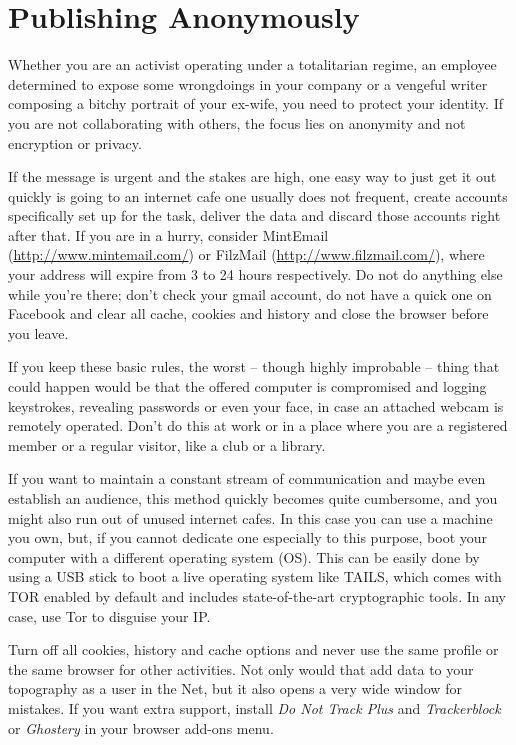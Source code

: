 \section{Publishing Anonymously}

Whether you are an activist operating under a totalitarian regime, an
employee determined to expose some wrongdoings in your company or a
vengeful writer composing a bitchy portrait of your ex-wife, you need to
protect your identity. If you are not collaborating with others, the
focus lies on anonymity and not encryption or privacy.

If the message is urgent and the stakes are high, one easy way to just
get it out quickly is going to an internet cafe one usually does not
frequent, create accounts specifically set up for the task, deliver the
data and discard those accounts right after that. If you are in a hurry,
consider MintEmail
(\href{http://www.mintemail.com/}{http://www.mintemail.com/}) or
FilzMail (\href{http://www.filzmail.com/}{http://www.filzmail.com/}),
where your address will expire from 3 to 24 hours respectively. Do not
do anything else while you're there; don't check your gmail account, do
not have a quick one on Facebook and clear all cache, cookies and
history and close the browser before you leave.

If you keep these basic rules, the worst -- though highly improbable --
thing that could happen would be that the offered computer is
compromised and logging keystrokes, revealing passwords or even your
face, in case an attached webcam is remotely operated. Don't do this at
work or in a place where you are a registered member or a regular
visitor, like a club or a library.

If you want to maintain a constant stream of communication and maybe
even establish an audience, this method quickly becomes quite
cumbersome, and you might also run out of unused internet cafes. In this
case you can use a machine you own, but, if you cannot dedicate one
especially to this purpose, boot your computer with a different
operating system (OS). This can be easily done by using a USB stick to
boot a live operating system like TAILS, which comes with TOR enabled by
default and includes state-of-the-art cryptographic tools. In any case,
use Tor to disguise your IP.

Turn off all cookies, history and cache options and never use the same
profile or the same browser for other activities. Not only would that
add data to your topography as a user in the Net, but it also opens a
very wide window for mistakes. If you want extra support, install
\emph{Do Not Track Plus} and \emph{Trackerblock} or \emph{Ghostery} in
your browser add-ons menu.


